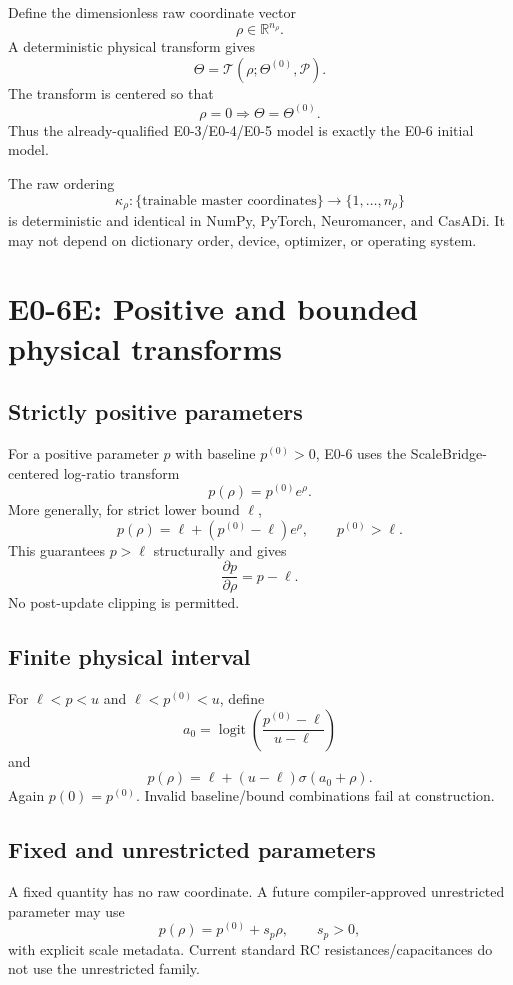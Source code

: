 \documentclass[11pt]{article}
\newcommand{\R}{\mathbb{R}}
\newcommand{\logit}{\operatorname{logit}}
\newcommand{\sigmoid}{\sigma}
\begin{document}
Define the dimensionless raw coordinate vector
\[
\boxed{\rho\in\R^{n_\rho}}.
\]
A deterministic physical transform gives
\[
\boxed{\Theta=\mathcal T(\rho;\Theta^{(0)},\mathcal P)}.
\]
The transform is centered so that
\[
\boxed{\rho=0\Longrightarrow\Theta=\Theta^{(0)}}.
\]
Thus the already-qualified E0-3/E0-4/E0-5 model is exactly the E0-6 initial
model.

The raw ordering
\[
\kappa_\rho:\{\text{trainable master coordinates}\}\to\{1,\ldots,n_\rho\}
\]
is deterministic and identical in NumPy, PyTorch, Neuromancer, and CasADi.
It may not depend on dictionary order, device, optimizer, or operating system.

\section{E0-6E: Positive and bounded physical transforms}

\subsection{Strictly positive parameters}
For a positive parameter $p$ with baseline $p^{(0)}>0$, E0-6 uses the
ScaleBridge-centered log-ratio transform
\[
\boxed{p(\rho)=p^{(0)}e^{\rho}.}
\]
More generally, for strict lower bound $\ell$,
\[
\boxed{p(\rho)=\ell+(p^{(0)}-\ell)e^{\rho},\qquad p^{(0)}>\ell.}
\]
This guarantees $p>\ell$ structurally and gives
\[
\frac{\partial p}{\partial\rho}=p-\ell.
\]
No post-update clipping is permitted.

\subsection{Finite physical interval}
For $\ell<p<u$ and $\ell<p^{(0)}<u$, define
\[
a_0=\logit\left(\frac{p^{(0)}-\ell}{u-\ell}\right)
\]
and
\[
\boxed{p(\rho)=\ell+(u-\ell)\sigmoid(a_0+\rho).}
\]
Again $p(0)=p^{(0)}$. Invalid baseline/bound combinations fail at construction.

\subsection{Fixed and unrestricted parameters}
A fixed quantity has no raw coordinate. A future compiler-approved unrestricted
parameter may use
\[
\boxed{p(\rho)=p^{(0)}+s_p\rho,\qquad s_p>0,}
\]
with explicit scale metadata. Current standard RC resistances/capacitances do not
use the unrestricted family.
\end{document}
